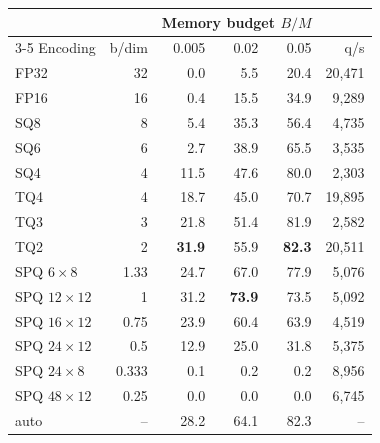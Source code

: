 \begin{tabular}{@{}lrrrrr@{}}
\toprule
& & \multicolumn{3}{c}{Memory budget $B/M$} & \\
\cmidrule(lr){3-5}
Encoding & b/dim & 0.005 & 0.02 & 0.05 & q/s \\
\midrule
FP32 & 32 & 0.0 & 5.5 & 20.4 & 20{,}471 \\
FP16 & 16 & 0.4 & 15.5 & 34.9 & 9{,}289 \\
SQ8 & 8 & 5.4 & 35.3 & 56.4 & 4{,}735 \\
SQ6 & 6 & 2.7 & 38.9 & 65.5 & 3{,}535 \\
SQ4 & 4 & 11.5 & 47.6 & 80.0 & 2{,}303 \\
TQ4 & 4 & 18.7 & 45.0 & 70.7 & 19{,}895 \\
TQ3 & 3 & 21.8 & 51.4 & 81.9 & 2{,}582 \\
TQ2 & 2 & \textbf{31.9} & 55.9 & \textbf{82.3} & 20{,}511 \\
SPQ $6{\times}8$ & 1.33 & 24.7 & 67.0 & 77.9 & 5{,}076 \\
SPQ $12{\times}12$ & 1 & 31.2 & \textbf{73.9} & 73.5 & 5{,}092 \\
SPQ $16{\times}12$ & 0.75 & 23.9 & 60.4 & 63.9 & 4{,}519 \\
SPQ $24{\times}12$ & 0.5 & 12.9 & 25.0 & 31.8 & 5{,}375 \\
SPQ $24{\times}8$ & 0.333 & 0.1 & 0.2 & 0.2 & 8{,}956 \\
SPQ $48{\times}12$ & 0.25 & 0.0 & 0.0 & 0.0 & 6{,}745 \\
\midrule
auto & -- & 28.2 & 64.1 & 82.3 & -- \\
\bottomrule
\end{tabular}
